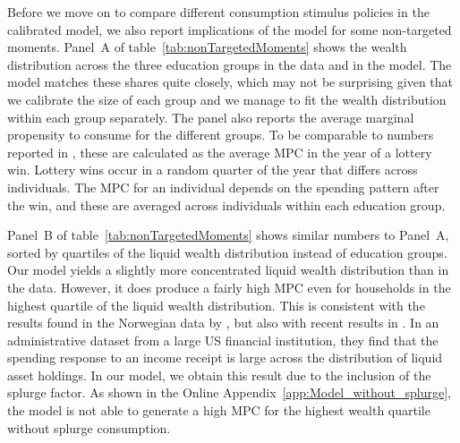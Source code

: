 \documentclass[\econtexRoot/HAFiscal]{subfiles}
\begin{document}
Before we move on to compare different consumption stimulus policies in the calibrated model, we also report implications of the model for some non-targeted moments.
Panel~A of table~\ref{tab:nonTargetedMoments} shows the wealth distribution across the three education groups in the data and in the model.
The model matches these shares quite closely, which may not be surprising given that we calibrate the size of each group and we manage to fit the wealth distribution within each group separately.
The panel also reports the average marginal propensity to consume for the different groups.
To be comparable to numbers reported in \citet{fagereng_mpc_2021}, these are calculated as the average MPC in the year of a lottery win.
Lottery wins occur in a random quarter of the year that differs across individuals.
The MPC for an individual depends on the spending pattern after the win, and these are averaged across individuals within each education group.


Panel~B of table~\ref{tab:nonTargetedMoments} shows similar numbers to Panel~A, sorted by quartiles of the liquid wealth distribution instead of education groups.
Our model yields a slightly more concentrated liquid wealth distribution than in the data.
However, it does produce a fairly high MPC even for households in the highest quartile of the liquid wealth distribution.
This is consistent with the results found in the Norwegian data by \citet{fagereng_mpc_2021}, but also with recent results in \citet{graham2024mental}.
In an administrative dataset from a large US financial institution, they find that the spending response to an income receipt is large across the distribution of liquid asset holdings.
In our model, we obtain this result due to the inclusion of the splurge factor.
As shown in the Online Appendix~\ref{app:Model_without_splurge}, the model is not able to generate a high MPC for the highest wealth quartile without splurge consumption.
\end{document}
